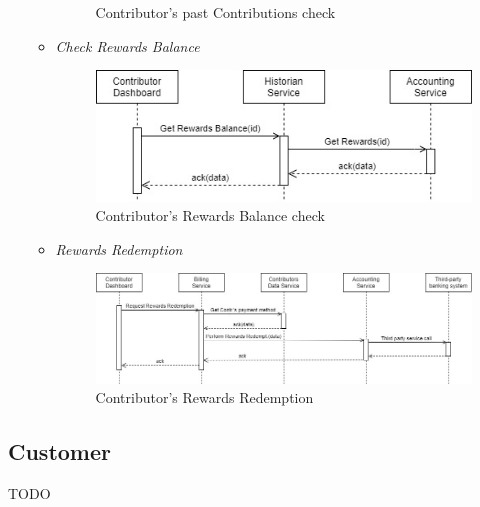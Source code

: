 \begin{itemize}
\begin{itemize}
\begin{figure}[!ht]
            \caption{Contributor's past Contributions check}
            \label{fig:use_cases_satisfaction_past_contributions_check}
        \end{figure}
        \item \textit{Check Rewards Balance}\\
        \begin{figure}[!ht]
            \centering
            \includegraphics[scale=0.65]{document/chapters/chapter_6/images/use_cases_satisfaction_rewards_balance.jpg}
            \caption{Contributor's Rewards Balance check}
            \label{fig:use_cases_satisfaction_rewards_balance}
        \end{figure}
        \item \textit{Rewards Redemption}\\
        \begin{figure}[!ht]
            \centering
            \includegraphics[width=\linewidth]{document/chapters/chapter_6/images/use_cases_satisfaction_rewards_redemption.jpg}
            \caption{Contributor's Rewards Redemption}
            \label{fig:use_cases_satisfaction_rewards_redemption}
        \end{figure}
    \end{itemize}
\end{itemize}

\subsection{Customer}
TODO

